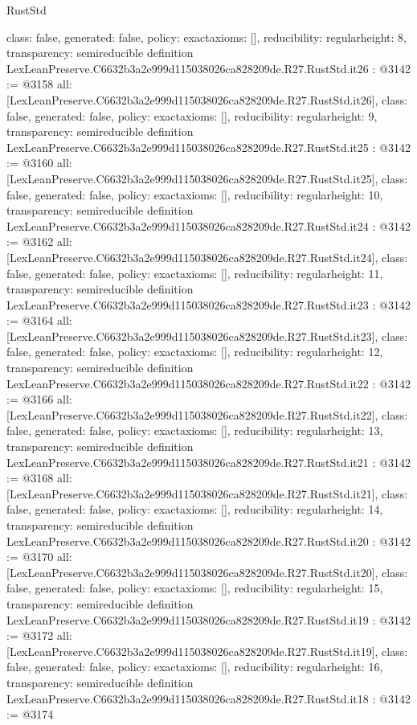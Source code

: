 \begin{lexlean}{RustStd}
\begin{coremodule}
{  class: false,
  generated: false,
  policy: exact{axioms: []},
  reducibility: regular{height: 8},
  transparency: semireducible
}
definition LexLeanPreserve.C6632b3a2e999d115038026ca828209de.R27.RustStd.it26 : @3142 := @3158 {
  all: [LexLeanPreserve.C6632b3a2e999d115038026ca828209de.R27.RustStd.it26],
  class: false,
  generated: false,
  policy: exact{axioms: []},
  reducibility: regular{height: 9},
  transparency: semireducible
}
definition LexLeanPreserve.C6632b3a2e999d115038026ca828209de.R27.RustStd.it25 : @3142 := @3160 {
  all: [LexLeanPreserve.C6632b3a2e999d115038026ca828209de.R27.RustStd.it25],
  class: false,
  generated: false,
  policy: exact{axioms: []},
  reducibility: regular{height: 10},
  transparency: semireducible
}
definition LexLeanPreserve.C6632b3a2e999d115038026ca828209de.R27.RustStd.it24 : @3142 := @3162 {
  all: [LexLeanPreserve.C6632b3a2e999d115038026ca828209de.R27.RustStd.it24],
  class: false,
  generated: false,
  policy: exact{axioms: []},
  reducibility: regular{height: 11},
  transparency: semireducible
}
definition LexLeanPreserve.C6632b3a2e999d115038026ca828209de.R27.RustStd.it23 : @3142 := @3164 {
  all: [LexLeanPreserve.C6632b3a2e999d115038026ca828209de.R27.RustStd.it23],
  class: false,
  generated: false,
  policy: exact{axioms: []},
  reducibility: regular{height: 12},
  transparency: semireducible
}
definition LexLeanPreserve.C6632b3a2e999d115038026ca828209de.R27.RustStd.it22 : @3142 := @3166 {
  all: [LexLeanPreserve.C6632b3a2e999d115038026ca828209de.R27.RustStd.it22],
  class: false,
  generated: false,
  policy: exact{axioms: []},
  reducibility: regular{height: 13},
  transparency: semireducible
}
definition LexLeanPreserve.C6632b3a2e999d115038026ca828209de.R27.RustStd.it21 : @3142 := @3168 {
  all: [LexLeanPreserve.C6632b3a2e999d115038026ca828209de.R27.RustStd.it21],
  class: false,
  generated: false,
  policy: exact{axioms: []},
  reducibility: regular{height: 14},
  transparency: semireducible
}
definition LexLeanPreserve.C6632b3a2e999d115038026ca828209de.R27.RustStd.it20 : @3142 := @3170 {
  all: [LexLeanPreserve.C6632b3a2e999d115038026ca828209de.R27.RustStd.it20],
  class: false,
  generated: false,
  policy: exact{axioms: []},
  reducibility: regular{height: 15},
  transparency: semireducible
}
definition LexLeanPreserve.C6632b3a2e999d115038026ca828209de.R27.RustStd.it19 : @3142 := @3172 {
  all: [LexLeanPreserve.C6632b3a2e999d115038026ca828209de.R27.RustStd.it19],
  class: false,
  generated: false,
  policy: exact{axioms: []},
  reducibility: regular{height: 16},
  transparency: semireducible
}
definition LexLeanPreserve.C6632b3a2e999d115038026ca828209de.R27.RustStd.it18 : @3142 := @3174 {
}
\end{coremodule}
\end{lexlean}
